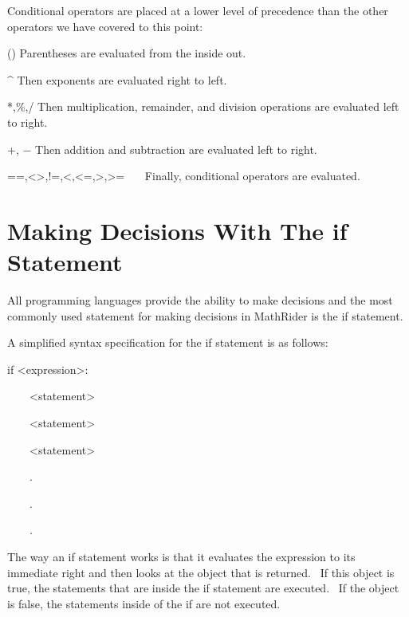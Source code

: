 \documentclass[12pt,twoside]{book}
\begin{document}
Conditional operators are placed at a lower level of precedence than the other operators we have covered to this point:


\bigskip

() Parentheses are evaluated from the inside out.


\bigskip

\^{} Then exponents are evaluated right to left.


\bigskip

*,\%,/ Then multiplication, remainder, and division operations are evaluated left to right.


\bigskip

+, $-$ Then addition and subtraction are evaluated left to right.


\bigskip

==,{\textless}{\textgreater},!=,{\textless},{\textless}=,{\textgreater},{\textgreater}=
\ \ \ Finally, conditional operators are evaluated.

\section[Making Decisions With The if Statement]{Making Decisions With The if Statement}

All programming languages provide the ability to make decisions and the most commonly used statement for making decisions in MathRider is the if statement. 

\bigskip

A simplified syntax specification for the if statement is as follows:


\bigskip

if {\textless}expression{\textgreater}:

\ \ \ \ {\textless}statement{\textgreater}

\ \ \ \ {\textless}statement{\textgreater}

\ \ \ \ {\textless}statement{\textgreater}

\ \ \ \ .

\ \ \ \ .

\ \ \ \ .


\bigskip

The way an if statement works is that it evaluates the expression to its immediate right and then looks at the object that is returned. \ If this object is {\textquotedbl}true{\textquotedbl}, the statements that are inside the if statement are executed. \ If the object is {\textquotedbl}false{\textquotedbl}, the statements inside of the if are not executed. 
\end{document}
